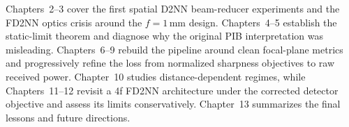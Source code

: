 Chapters~2--3 cover the first spatial D2NN beam-reducer experiments and the
FD2NN optics crisis around the $f=1$\,mm design. Chapters~4--5 establish the
static-limit theorem and diagnose why the original PIB interpretation was
misleading. Chapters~6--9 rebuild the pipeline around clean focal-plane metrics
and progressively refine the loss from normalized sharpness objectives to raw
received power. Chapter~10 studies distance-dependent regimes, while
Chapters~11--12 revisit a 4f FD2NN architecture under the corrected detector
objective and assess its limits conservatively. Chapter~13 summarizes the final
lessons and future directions.
